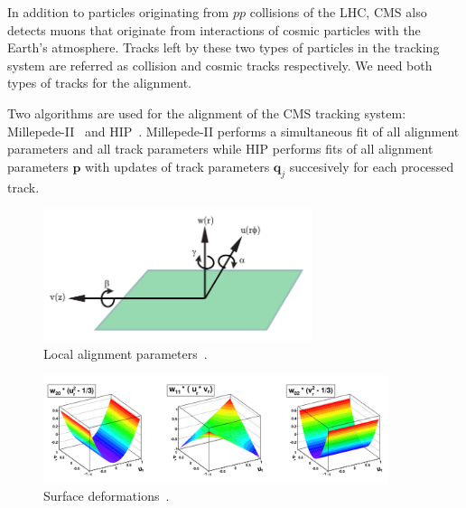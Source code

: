In addition to particles originating from $pp$ collisions of the LHC, CMS also detects muons that originate from interactions of cosmic particles with the Earth's atmosphere. Tracks left by these two types of particles in the tracking system are referred as collision and cosmic tracks respectively. We need both types of tracks for the alignment. %

Two algorithms are used for the alignment of the CMS tracking system: Millepede-II~\cite{ref_MPII_Alg} and HIP~\cite{ref_HIP_Alg}. Millepede-II performs a simultaneous fit of all alignment parameters and all track parameters while HIP performs fits of all alignment parameters $\mathbf{p}$ with updates of track parameters $\mathbf{q}_j$ succesively for each processed track.

\begin{figure}[htb]
    \begin{center}
        \includegraphics[width=0.70\textwidth]{../figs/Alignment/alignment_strip_coords.png}
    \end{center}
    \caption{Local alignment parameters~\cite{ref_Frank_thesis}.}
    \label{fig:alignmentParameters}
\end{figure}

\begin{figure}[htb]
    \begin{center}
        \includegraphics[width=0.90\textwidth]{../figs/Alignment/alignment_surface_deformations.png}
    \end{center}
    \caption{Surface deformations~\cite{ref_Alignment}.}
    \label{fig:surfaceDeformations}
\end{figure}

